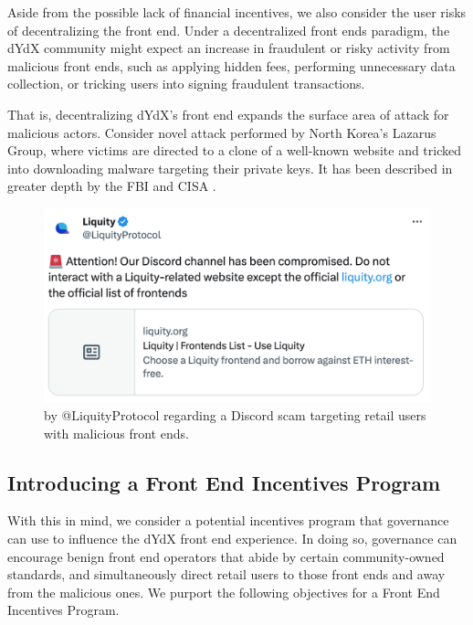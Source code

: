         Aside from the possible lack of financial incentives, we also consider the user risks of decentralizing the front end. Under a decentralized front ends paradigm, the dYdX community might expect an increase in fraudulent or risky activity from malicious front ends, such as applying hidden fees, performing unnecessary data collection, or tricking users into signing fraudulent transactions. 
    
        That is, decentralizing dYdX's front end expands the surface area of attack for malicious actors. Consider  novel attack performed by North Korea's Lazarus Group, where victims are directed to a clone of a well-known website and tricked into downloading malware targeting their private keys. It has been described in greater depth by the FBI and CISA . 
    
        \begin{figure}[H]
            \centering
            \includegraphics[width=0.5\linewidth]{figs/liquityscam.png}
            \captionsetup{width=0.5\linewidth}
            \caption{ by @LiquityProtocol regarding a Discord scam targeting retail users with malicious front ends.}
            \label{fig:liquityscam}
        \end{figure}

    \subsection{Introducing a Front End Incentives Program}
    
    With this in mind, we consider a potential incentives program that governance can use to influence the dYdX front end experience. In doing so, governance can encourage benign front end operators that abide by certain community-owned standards, and simultaneously direct retail users to those front ends and away from the malicious ones. We purport the following objectives for a Front End Incentives Program.
    
